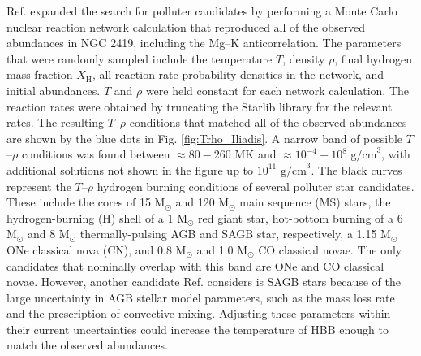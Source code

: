Ref. \cite{Iliadis2016} expanded the search for polluter candidates by performing a Monte Carlo nuclear reaction network calculation that reproduced all of the observed abundances in NGC 2419, including the Mg--K anticorrelation. The parameters that were randomly sampled include the temperature $T$, density $\rho$, final hydrogen mass fraction $X_{\mathrm{H}}$, all reaction rate probability densities in the network, and initial abundances. $T$ and $\rho$ were held constant for each network calculation. The reaction rates were obtained by truncating the Starlib \cite{Sallaska2013} library for the relevant rates. The resulting $T$--$\rho$ conditions that matched all of the observed abundances are shown by the blue dots in Fig. \ref{fig:Trho_Iliadis}. A narrow band of possible $T$--$\rho$ conditions was found between $\approx80-260$ MK and $\approx10^{-4}-10^{8}$ $\mathrm{g/cm}^{3}$, with additional solutions not shown in the figure up to $10^{11}$ $\mathrm{g/cm}^{3}$. The black curves  represent the $T$--$\rho$ hydrogen burning conditions of several polluter star candidates. These include the cores of 15 $\mathrm{M}_{\odot}$ and 120 $\mathrm{M}_{\odot}$ main sequence (MS) stars, the hydrogen-burning (H) shell of a 1 $\mathrm{M}_{\odot}$ red giant star, hot-bottom burning of a 6 $\mathrm{M}_{\odot}$ and 8 $\mathrm{M}_{\odot}$ thermally-pulsing AGB and SAGB star, respectively, a 1.15 $\mathrm{M}_{\odot}$ ONe classical nova (CN), and 0.8 $\mathrm{M}_{\odot}$ and 1.0 $\mathrm{M}_{\odot}$ CO classical novae. The only candidates that nominally overlap with this band are ONe and CO classical novae. However, another candidate Ref. \cite{Iliadis2016} considers is SAGB stars because of the large uncertainty in AGB stellar model parameters, such as the mass loss rate and the prescription of convective mixing. Adjusting these parameters within their current uncertainties could increase the temperature of HBB enough to match the observed abundances.

